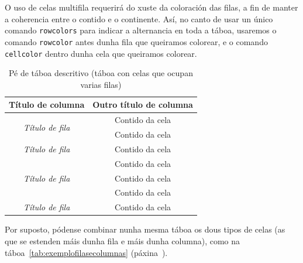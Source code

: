 O uso de celas multifila requerirá do xuste da coloración das filas, a fin de manter
a coherencia entre o contido e o continente. Así, no canto de usar un único comando
\verb+rowcolors+ para indicar a alternancia en toda a táboa, usaremos o comando
\verb+rowcolor+ antes dunha fila que queiramos colorear, e o comando \verb+cellcolor+
dentro dunha cela que queiramos colorear.

\begin{table}[hp!]
  \centering
  \begin{tabular}{c|c}
  \rowcolor{udcpink!25}
  \textbf{Título de columna} & \textbf{Outro título de columna} \\\hline
  \multirow{2}{*}{\textit{Título de fila}} & \cellcolor{udcgray!25} Contido da cela \\
                                           & Contido da cela \\
  \rowcolor{udcgray!25}
  \textit{Título de fila}                  & Contido da cela \\
  \multirow{3}{*}{\textit{Título de fila}} & Contido da cela \\
                                           & \cellcolor{udcgray!25} Contido da cela \\
                                           & Contido da cela \\
  \rowcolor{udcgray!25}
  \textit{Título de fila}                  & Contido da cela \\
  \end{tabular}
  \caption{Pé de táboa descritivo (táboa con celas que ocupan varias filas)}
  \label{tab:exemplofilas}
\end{table}

Por suposto, pódense combinar nunha mesma táboa os dous tipos de celas (as que se 
estenden máis dunha fila e máis dunha columna), como na táboa~\ref{tab:exemplofilasecolumnas}
(páxina~\pageref{tab:exemplofilasecolumnas}).


